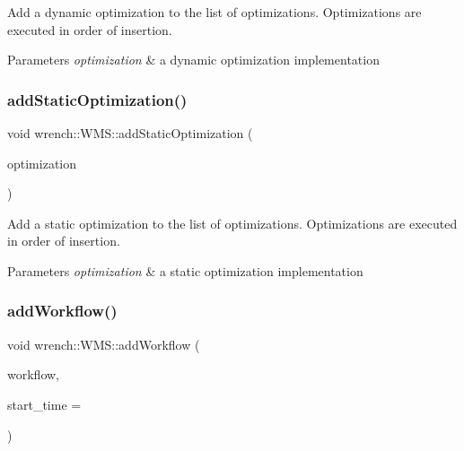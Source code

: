 Add a dynamic optimization to the list of optimizations. Optimizations are executed in order of insertion. 


\begin{DoxyParams}{Parameters}
{\em optimization} & a dynamic optimization implementation \\
\hline
\end{DoxyParams}
\mbox{\label{classwrench_1_1_w_m_s_a21b9ae8ef40ba22e5ef0052fb70f7731}} 
\subsubsection{\texorpdfstring{add\+Static\+Optimization()}{addStaticOptimization()}}
{\footnotesize\ttfamily void wrench\+::\+W\+M\+S\+::add\+Static\+Optimization (\begin{DoxyParamCaption}\item[{std\+::unique\+\_\+ptr$<$ \hyperlink{classwrench_1_1_static_optimization}{Static\+Optimization} $>$}]{optimization }\end{DoxyParamCaption})}



Add a static optimization to the list of optimizations. Optimizations are executed in order of insertion. 


\begin{DoxyParams}{Parameters}
{\em optimization} & a static optimization implementation \\
\hline
\end{DoxyParams}
\mbox{\label{classwrench_1_1_w_m_s_afd2a6ae2f4d792046a6a17d5c0dc313f}} 
\subsubsection{\texorpdfstring{add\+Workflow()}{addWorkflow()}}
{\footnotesize\ttfamily void wrench\+::\+W\+M\+S\+::add\+Workflow (\begin{DoxyParamCaption}\item[{\hyperlink{classwrench_1_1_workflow}{Workflow} $\ast$}]{workflow,  }\item[{double}]{start\+\_\+time = {} }\end{DoxyParamCaption})}



